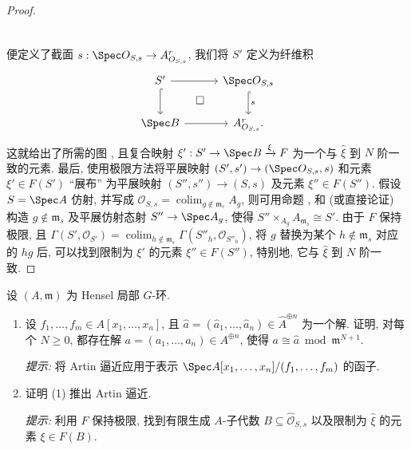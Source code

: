 \begin{proof}
\[\begin{tikzcd}[column sep=1.8em,row sep=2em]
\end{tikzcd}
\]
便定义了截面 $s:\Spec\mathcal O_{S,s}\to\mathbb A^r_{\mathcal O_{S,s}}$, 我们将 $S'$ 定义为纤维积
\[
\begin{tikzcd}[column sep=3em,row sep=2.1em]
S'\arrow[r]\arrow[d,hook]\arrow[dr,phantom,"\square" description]&\Spec\mathcal O_{S,s}\arrow[d,hook,"s"]\\
\Spec B\arrow[r]&\mathbb A^r_{\mathcal O_{S,s}}.
\end{tikzcd}
\]
这就给出了所需的图 , 且复合映射 $\xi':S'\to\Spec B\xrightarrow{\xi}F$ 为一个与 $\widehat\xi$ 到 $N$ 阶一致的元素. 最后, 使用极限方法将平展映射 $(S',s')\to(\Spec\mathcal O_{S,s},s)$ 和元素 $\xi'\in F(S')$ ``展布'' 为平展映射 $(S'',s'')\to(S,s)$ 及元素 $\xi''\in F(S'')$. 假设 $S=\Spec A$ 仿射, 并写成 $\mathcal O_{S,s}=\operatorname{colim}_{g\notin\mathfrak m_s}A_g$, 则可用命题 ,  和  (或直接论证) 构造 $g\notin\mathfrak m_s$ 及平展仿射态射 $S''\to\Spec A_g$, 使得 $S''\times_{A_g}A_{\mathfrak m_s}\cong S'$. 由于 $F$ 保持极限, 且 $\Gamma(S',\mathcal O_{S'})=\operatorname{colim}_{h\notin\mathfrak m_s}\Gamma(S''_h,\mathcal O_{S''_h})$, 将 $g$ 替换为某个 $h\notin\mathfrak m_s$ 对应的 $hg$ 后, 可以找到限制为 $\xi'$ 的元素 $\xi''\in F(S'')$, 特别地, 它与 $\widehat\xi$ 到 $N$ 阶一致.
\end{proof}
\newpage
\begin{exercise}[其他表述]\label{src:B.5.20}
设 $(A,\mathfrak m)$ 为 Hensel 局部 $G$-环.
\begin{enumerate}[(1)]
\item 设 $f_1,\ldots,f_m\in A[x_1,\ldots,x_n]$, 且 $\widehat a=(\widehat a_1,\ldots,\widehat a_n)\in\widehat A^{\oplus n}$ 为一个解. 证明, 对每个 $N\geq0$, 都存在解 $a=(a_1,\ldots,a_n)\in A^{\oplus n}$, 使得 $a\cong\widehat a\bmod\mathfrak m^{N+1}$.

\textit{提示:} 将 Artin 逼近应用于表示 $\Spec A[x_1,\ldots,x_n]/(f_1,\ldots,f_m)$ 的函子.
\item 证明 (1) 推出 Artin 逼近.

\textit{提示:} 利用 $F$ 保持极限, 找到有限生成 $A$-子代数 $B\subseteq\widehat{\mathcal O}_{S,s}$ 以及限制为 $\widehat\xi$ 的元素 $\xi\in F(B)$.
\end{enumerate}
\end{exercise}

